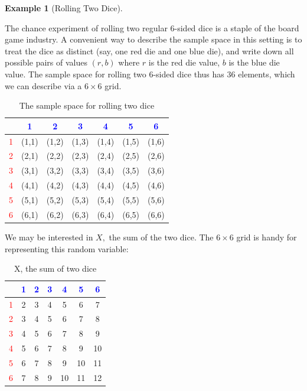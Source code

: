 \documentclass[
]{book}
\theoremstyle{definition}
\theoremstyle{definition}
\newtheorem{example}{Example}[chapter]
\theoremstyle{definition}
\theoremstyle{definition}
\theoremstyle{remark}
\begin{document}
\begin{example}[Rolling Two Dice]
\protect\hypertarget{exm:roll2dice}{}\label{exm:roll2dice}

The chance experiment of rolling two regular 6-sided dice is a staple of the board game industry. A convenient way to describe the sample space in this setting is to treat the dice as distinct (say, one red die and one blue die), and write down all possible pairs of values \((r,b)\) where \(r\) is the red die value, \(b\) is the blue die value. The sample space for rolling two 6-sided dice thus has 36 elements, which we can describe via a \(6 \times 6\) grid.

\begin{table}[!h]
\centering\centering
\caption{\label{tab:unnamed-chunk-3}The sample space for rolling two dice}
\centering
\begin{tabular}[t]{>{}l||>{}c|c|c|c|c|c}
\hline
\textcolor{blue}{ } & \textcolor{blue}{1} & \textcolor{blue}{2} & \textcolor{blue}{3} & \textcolor{blue}{4} & \textcolor{blue}{5} & \textcolor{blue}{6}\\
\hline
\textcolor{red}{1} & (1,1) & (1,2) & (1,3) & (1,4) & (1,5) & (1,6)\\
\hline
\textcolor{red}{2} & (2,1) & (2,2) & (2,3) & (2,4) & (2,5) & (2,6)\\
\hline
\textcolor{red}{3} & (3,1) & (3,2) & (3,3) & (3,4) & (3,5) & (3,6)\\
\hline
\textcolor{red}{4} & (4,1) & (4,2) & (4,3) & (4,4) & (4,5) & (4,6)\\
\hline
\textcolor{red}{5} & (5,1) & (5,2) & (5,3) & (5,4) & (5,5) & (5,6)\\
\hline
\textcolor{red}{6} & (6,1) & (6,2) & (6,3) & (6,4) & (6,5) & (6,6)\\
\hline
\end{tabular}
\end{table}

We may be interested in \(X,\) the sum of the two dice. The \(6 \times 6\) grid is handy for representing this random variable:

\begin{table}[!h]
\centering\centering
\caption{\label{tab:unnamed-chunk-4}X, the sum of two dice}
\centering
\begin{tabular}[t]{>{}l||>{}c|c|c|c|c|c}
\hline
\textcolor{blue}{ } & \textcolor{blue}{1} & \textcolor{blue}{2} & \textcolor{blue}{3} & \textcolor{blue}{4} & \textcolor{blue}{5} & \textcolor{blue}{6}\\
\hline
\textcolor{red}{1} & 2 & 3 & 4 & 5 & 6 & 7\\
\hline
\textcolor{red}{2} & 3 & 4 & 5 & 6 & 7 & 8\\
\hline
\textcolor{red}{3} & 4 & 5 & 6 & 7 & 8 & 9\\
\hline
\textcolor{red}{4} & 5 & 6 & 7 & 8 & 9 & 10\\
\hline
\textcolor{red}{5} & 6 & 7 & 8 & 9 & 10 & 11\\
\hline
\textcolor{red}{6} & 7 & 8 & 9 & 10 & 11 & 12\\
\hline
\end{tabular}
\end{table}


\end{example}
\end{document}
